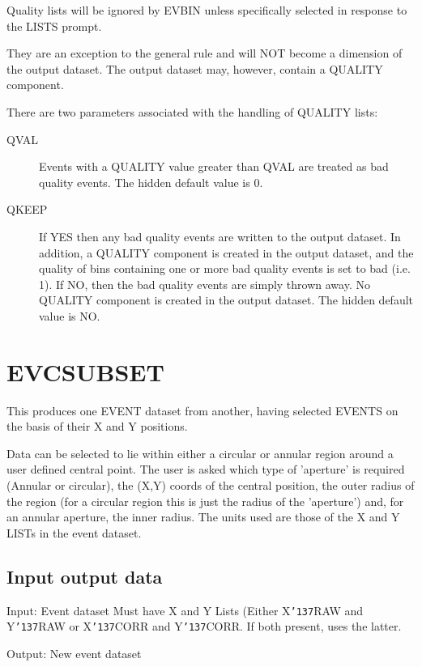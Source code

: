 \documentclass{book}
\renewcommand{\_}{{\tt\char'137}}     %
\begin{document}
Quality lists will be ignored by EVBIN unless specifically
selected in response to the LISTS prompt.
 
They are an exception to the general rule and will NOT become a
dimension of the output dataset. The output dataset may, however,
contain a QUALITY component.
 
There are two parameters associated with the handling of QUALITY
lists:
 
\begin{description}
\item[QVAL]
Events with a QUALITY value greater than QVAL are
treated as bad quality events. The hidden default
value is 0.
\item[QKEEP]
If YES then any bad quality events are written to the
output dataset. In addition, a QUALITY component is
created in the output dataset, and the quality of bins
containing one or more bad quality events is set to
bad (i.e. 1).
If NO, then the bad quality events are simply
thrown away. No QUALITY component is created in the
output dataset.
The hidden default value is NO.
\end{description}
\section{EVCSUBSET}
This produces one EVENT dataset from another, having selected
EVENTS on the basis of their X and Y positions.
 
Data can be selected to lie within either a circular or annular
region around a user defined central point. The user is asked
which type of 'aperture' is required (Annular or circular), the
(X,Y) coords of the central position, the outer radius of the
region (for a circular region this is just the radius of the
'aperture') and, for an annular aperture, the inner radius.
The units used are those of the X and Y LISTs in the event
dataset.
 
\subsection{Input output data}
Input: Event dataset
Must have X and Y Lists (Either X\_RAW and Y\_RAW or
X\_CORR and Y\_CORR. If both present, uses the latter.
 
Output: New event dataset
 
\end{document}
